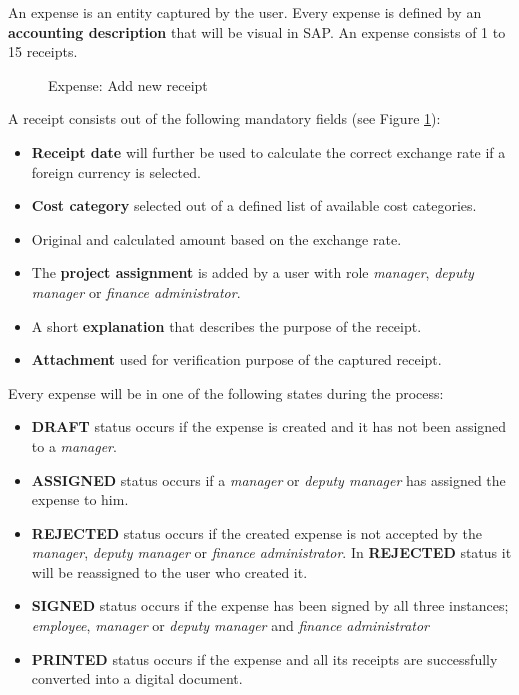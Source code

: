 An expense is an entity captured by the user. Every expense is defined by an \textbf{accounting description} that will be visual in SAP. An expense consists of 1 to 15 receipts. 

\begin{figure}[H]
    \centering
    \caption{Expense: Add new receipt}
    \label{fig:expenses-add01}
\end{figure}

A receipt consists out of the following mandatory fields (see Figure \ref{fig:expenses-add01}):
\begin{itemize}
    \item \textbf{Receipt date} will further be used to calculate the correct exchange rate if a foreign currency is selected.  
    \item \textbf{Cost category} selected out of a defined list of available cost categories.
    \item Original and calculated amount based on the exchange rate.
    \item The \textbf{project assignment} is added by a user with role \textit{manager}, \textit{deputy manager} or \textit{finance administrator}.
    \item A short \textbf{explanation} that describes the purpose of the receipt.   
    \item \textbf{Attachment} used for verification purpose of the captured receipt. 
\end{itemize}

Every expense will be in one of the following states during the process:

\begin{itemize}
    \item \textbf{DRAFT} status occurs if the expense is created and it has not been assigned to a \textit{manager}.
    \item \textbf{ASSIGNED} status occurs if a \textit{manager} or \textit{deputy manager} has assigned the expense to him.
    \item \textbf{REJECTED} status occurs if the created expense is not accepted by the \textit{manager}, \textit{deputy manager} or \textit{finance administrator}. In \textbf{REJECTED} status it will be reassigned to the user who created it.
    \item \textbf{SIGNED} status occurs if the expense has been signed by all three instances; \textit{employee}, \textit{manager} or \textit{deputy manager} and \textit{finance administrator}
    \item \textbf{PRINTED} status occurs if the expense and all its receipts are successfully converted into a digital document.
\end{itemize}

